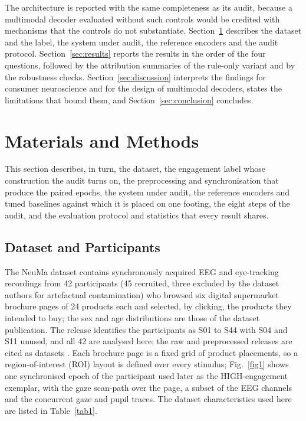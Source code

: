 \documentclass[pdflatex,sn-basic,Numbered,twocolumn,iicol]{sn-jnl}
\theoremstyle{thmstyleone}%
\theoremstyle{thmstyletwo}%
\theoremstyle{thmstylethree}%
\begin{document}
The architecture is reported with the same completeness as its audit, because a multimodal decoder evaluated without such controls would be credited with mechanisms that the controls do not substantiate. Section~\ref{sec:methods} describes the dataset and the label, the system under audit, the reference encoders and the audit protocol. Section~\ref{sec:results} reports the results in the order of the four questions, followed by the attribution summaries of the rule-only variant and by the robustness checks. Section~\ref{sec:discussion} interprets the findings for consumer neuroscience and for the design of multimodal decoders, states the limitations that bound them, and Section~\ref{sec:conclusion} concludes.



\section{Materials and Methods}\label{sec:methods}

This section describes, in turn, the dataset, the engagement label whose construction the audit turns on, the preprocessing and synchronisation that produce the paired epochs, the system under audit, the reference encoders and tuned baselines against which it is placed on one footing, the eight steps of the audit, and the evaluation protocol and statistics that every result shares.

\subsection{Dataset and Participants}\label{sec:data}

The NeuMa dataset \cite{ref35} contains synchronously acquired EEG and eye-tracking recordings from 42 participants (45 recruited, three excluded by the dataset authors for artefactual contamination) who browsed six digital supermarket brochure pages of 24 products each and selected, by clicking, the products they intended to buy; the sex and age distributions are those of the dataset publication. The release identifies the participants as S01 to S44 with S04 and S11 unused, and all 42 are analysed here; the raw and preprocessed releases are cited as datasets \cite{ref59,ref60}. Each brochure page is a fixed grid of product placements, so a region-of-interest (ROI) layout is defined over every stimulus; Fig.~\ref{fig1} shows one synchronised epoch of the participant used later as the HIGH-engagement exemplar, with the gaze scan-path over the page, a subset of the EEG channels and the concurrent gaze and pupil traces. The dataset characteristics used here are listed in Table~\ref{tab1}.
\end{document}
